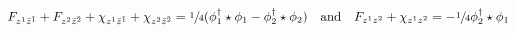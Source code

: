 \begin{equation}
  F_{z^1\bar{z}^{\bar{1}}}+ 
  F_{z^2\bar{z}^{\bar{2}}}+
  \chi_{z^1\bar{z}^{\bar{1}}}+\chi_{z^2\bar{z}^{\bar{2}}}
 =\sfrac{1}{4}
 (\phi_1^\dagger\star\phi_1-\phi_2^\dagger\star\phi_2) 
 \quad \text{and} \quad  F_{z^1z^2}+\chi_{z^1z^2}=
  -\sfrac{1}{4}\phi_2^\dagger\star\phi_1
\end{equation}

